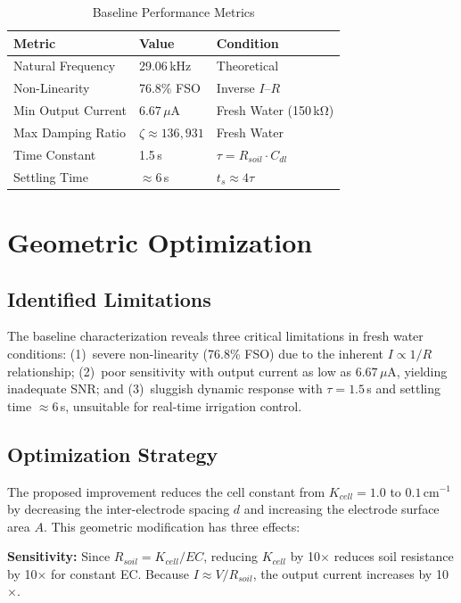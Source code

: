 \documentclass[conference]{IEEEtran}
\begin{document}
\begin{table}[H]
\centering
\caption{Baseline Performance Metrics}
\label{tab:baseline_perf}
\begin{tabular}{lll}
\toprule
\textbf{Metric} & \textbf{Value} & \textbf{Condition} \\
\midrule
Natural Frequency & 29.06\,kHz & Theoretical \\
Non-Linearity & 76.8\% FSO & Inverse $I$--$R$ \\
Min Output Current & $6.67\,\mu$A & Fresh Water (150\,k\si{\ohm}) \\
Max Damping Ratio & $\zeta \approx 136{,}931$ & Fresh Water \\
Time Constant & 1.5\,s & $\tau = R_{soil} \cdot C_{dl}$ \\
Settling Time & $\approx$6\,s & $t_s \approx 4\tau$ \\
\bottomrule
\end{tabular}
\end{table}

\section{Geometric Optimization}
\subsection{Identified Limitations}
The baseline characterization reveals three critical limitations in fresh water conditions: (1)~severe non-linearity (76.8\% FSO) due to the inherent $I \propto 1/R$ relationship; (2)~poor sensitivity with output current as low as $6.67\,\mu$A, yielding inadequate SNR; and (3)~sluggish dynamic response with $\tau = 1.5$\,s and settling time $\approx$6\,s, unsuitable for real-time irrigation control.

\subsection{Optimization Strategy}
The proposed improvement reduces the cell constant from $K_{cell} = 1.0$ to $0.1\,\text{cm}^{-1}$ by decreasing the inter-electrode spacing $d$ and increasing the electrode surface area $A$. This geometric modification has three effects:

\textbf{Sensitivity:} Since $R_{soil} = K_{cell}/EC$, reducing $K_{cell}$ by 10$\times$ reduces soil resistance by 10$\times$ for constant EC. Because $I \approx V/R_{soil}$, the output current increases by 10$\times$.
\end{document}
